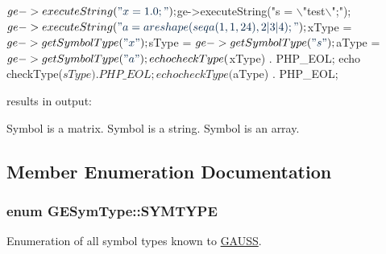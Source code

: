 \begin{DoxyCode}
$ge->executeString(\textcolor{stringliteral}{"x = 1.0;"});
$ge->executeString(\textcolor{stringliteral}{"s = \(\backslash\)"test\(\backslash\)";"});
$ge->executeString(\textcolor{stringliteral}{"a = areshape(seqa(1, 1, 24), 2|3|4);"});

$xType = $ge->getSymbolType(\textcolor{stringliteral}{"x"});
$sType = $ge->getSymbolType(\textcolor{stringliteral}{"s"});
$aType = $ge->getSymbolType(\textcolor{stringliteral}{"a"});

echo checkType($xType) . PHP\_EOL;
echo checkType($sType) . PHP\_EOL;
echo checkType($aType) . PHP\_EOL;
\end{DoxyCode}
 results in output\-: 
\begin{DoxyCode}
Symbol is a matrix.
Symbol is a \textcolor{keywordtype}{string}.
Symbol is an array.
\end{DoxyCode}
 

\subsection{Member Enumeration Documentation}
\hypertarget{struct_g_e_sym_type_a05477e08255bea70296f7825493e95fc}{
\subsubsection[{S\-Y\-M\-T\-Y\-P\-E}]{\setlength{\rightskip}{0pt plus 5cm}enum {\bf G\-E\-Sym\-Type\-::\-S\-Y\-M\-T\-Y\-P\-E}}}\label{struct_g_e_sym_type_a05477e08255bea70296f7825493e95fc}


Enumeration of all symbol types known to \hyperlink{class_g_a_u_s_s}{G\-A\-U\-S\-S}. 

